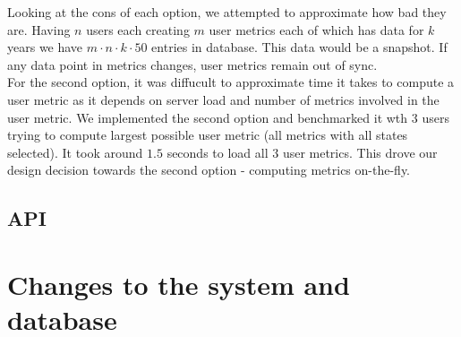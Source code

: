 Looking at the cons of each option, we attempted to approximate how bad they are. Having $n$ users each creating $m$ user metrics each of which has data for $k$ years we have $m \cdot n \cdot k \cdot 50$ entries in database. This data would be a snapshot. If any data point in metrics changes, user metrics remain out of sync. \\

For the second option, it was diffucult to approximate time it takes to compute a user metric as it depends on server load and number of metrics involved in the user metric. We implemented the second option and benchmarked it wth 3 users trying to compute largest possible user metric (all metrics with all states selected). It took around $1.5$ seconds to load all $3$ user metrics. This drove our design decision towards the second option - computing metrics on-the-fly.

\subsection{API}

\section{Changes to the system and database}
